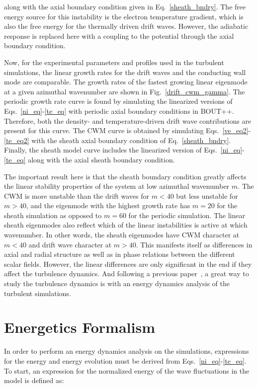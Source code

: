 \documentclass[showpacs,preprintnumbers,amsmath,amssymb,superscriptaddress,aip]{revtex4-1}
\begin{document}
along with the axial boundary condition given in Eq.~\ref{sheath_bndry}. The free energy source for this instability is the electron temperature gradient, which is also the free energy
for the thermally driven drift waves. However, the adiabatic response is replaced here with a coupling to the potential through the axial boundary condition.

Now, for the experimental parameters and profiles used in the turbulent simulations, 
the linear growth rates for the drift waves and the conducting wall mode are comparable. The growth rates of the fastest growing linear eigenmode at a given azimuthal wavenumber
are shown in Fig.~\ref{drift_cwm_gamma}.
The periodic growth rate curve is found by simulating the linearized versions of Eqs.~\ref{ni_eq}-\ref{te_eq} with periodic axial boundary conditions in BOUT++. Therefore, both the density- and
temperature-driven drift wave contributions are present for this curve.
The CWM curve is obtained by simulating Eqs.~\ref{ve_eq2}-\ref{te_eq2} with the sheath axial boundary condition of Eq.~\ref{sheath_bndry}. 
Finally, the sheath model curve includes the linearized version of Eqs.~\ref{ni_eq}-\ref{te_eq} along with the axial sheath boundary condition.

The important result here is that the sheath boundary condition greatly affects the linear stability properties of the system at low azimuthal wavenumber $m$. The CWM is more unstable
than the drift waves for $m<40$ but less unstable for $m>40$, and the eigenmode with the highest growth rate has $m=20$ for the sheath simulation as opposed to $m=60$ for the periodic simulation.
The linear sheath eigenmodes also reflect which of the linear instabilities is active at which wavenumber. In other words, the sheath eigenmodes have CWM character at $m<40$ and drift wave
character at $m>40$. This manifests itself as differences in axial and radial structure as well as in phase relations between the different scalar fields. However, the linear differences
are only significant in the end if they affect the turbulence dynamics. And following a previous paper~\cite{friedman2012b}, a great way to study the turbulence dynamics is with
an energy dynamics analysis of the turbulent simulations.


\section{Energetics Formalism}
\label{sec_energetics_machinery}

In order to perform an energy dynamics analysis on the simulations, expressions for the energy and energy evolution must be derived from Eqs.~\ref{ni_eq}-\ref{te_eq}.
To start, an expression for the normalized energy of the wave fluctuations in the model is defined as:
\end{document}
